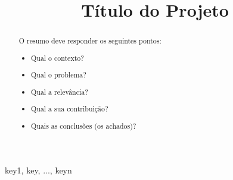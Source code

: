 \documentclass[conference]{IEEEtran}
\begin{document}
\title{Título do Projeto }

\author{
\and
{}
\and
{}
}

\maketitle

\begin{abstract}
O resumo deve responder os seguintes pontos:
\begin{itemize}
    \item Qual o contexto?
    \item Qual o problema?
    \item Qual a relevância?
    \item Qual a sua contribuição?
    \item Quais as conclusões (os achados)?
\end{itemize}
\end{abstract}

\begin{IEEEkeywords}
key1, key, ..., keyn
\end{IEEEkeywords}





\end{document}
